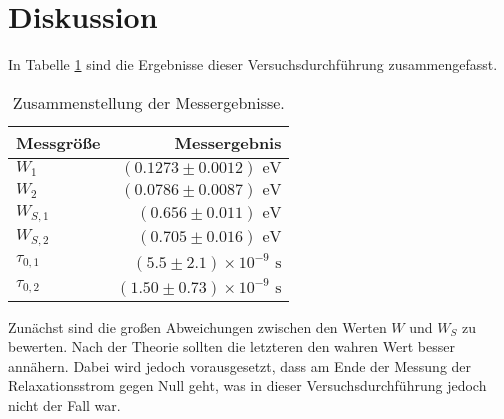 

\section{Diskussion}
In Tabelle \ref{tab:Diskussion} sind die Ergebnisse dieser Versuchsdurchführung
zusammengefasst.

\begin{table}[h]
\centering
\begin{tabular}{lr}
\midrule \midrule
Messgröße & Messergebnis\\
\midrule

$W_1$ &$ (0.1273\pm 0.0012) \text{ eV}$ \\

$W_2 $& $(0.0786\pm 0.0087) \text{ eV}$ \\

$W_{S,1}$ &$ (0.656\pm 0.011) \text{ eV}$ \\

$W_{S,2}$ &$ (0.705\pm 0.016) \text{ eV}$ \\

$\tau_{0,1}$ & $(5.5 \pm 2.1) \times 10^{-9}\text{ s}$ \\

$\tau_{0,2} $& $(1.50 \pm 0.73) \times 10^{-9}\text{ s} $\\
\midrule \midrule
\end{tabular}
\caption{Zusammenstellung der Messergebnisse.}
\label{tab:Diskussion}
\end{table}

Zunächst sind die großen Abweichungen zwischen den Werten $W$ und $W_S$ zu bewerten.
Nach der Theorie sollten die letzteren den wahren Wert besser annähern. Dabei
wird jedoch vorausgesetzt, dass am Ende der Messung der Relaxationsstrom gegen Null
geht, was in dieser Versuchsdurchführung jedoch nicht der Fall war.
